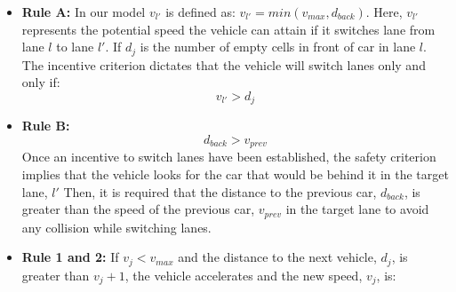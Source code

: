 \documentclass[oneside,letter,11pt]{article}
\begin{document}
\begin{itemize}
\item \textbf{Rule A:} 
In our model $v_{l'}$  is defined as: $ v_{l'} = min(v_{max}, d_{back})$. Here, $v_{l'}$ represents the potential speed the vehicle can attain if it switches lane from lane $l$ to lane $l'$. If $d_{j}$ is the number of empty cells in front of car in lane $l$. The incentive criterion dictates that the vehicle will switch lanes only and only if:
\begin{equation}
    v_{l'} > d_{j}
\end{equation}
\item \textbf{Rule B: \begin{equation}
        \label{eq:3}
    d_{back} > v_{prev}
\end{equation}}
Once an incentive to switch lanes have been established, the safety criterion implies that the vehicle looks for the car that would be behind it in the target lane, $l'$ Then, it is required that the distance to the previous car, $d_{back}$, is greater than the speed of the previous car, $v_{prev}$ in the target  lane to avoid any collision while switching lanes.

\item \textbf{Rule 1 and 2:} {If $v_j < v_{max}$ and the distance to the next vehicle, $d_j$, is greater than $v_j + 1$, the vehicle accelerates and the new speed, $v_j$, is:
\begin{equation}

\end{equation}}
\end{itemize}
\end{document}
